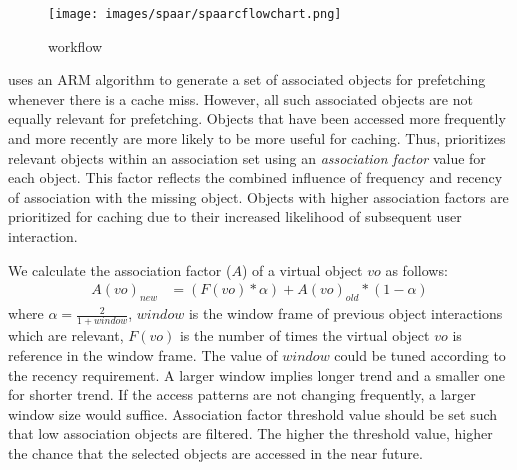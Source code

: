             \begin{figure}
                \centering
                \texttt{[image: images/spaar/spaarcflowchart.png]}
                \caption{\spaarc{} workflow}
                \label{fig:spaarcworkflow}
            \end{figure}

\spaarc{} uses an ARM algorithm to generate a set of associated objects for prefetching whenever there is a cache miss.
However, %
all such associated objects are not equally relevant for prefetching. Objects that have been accessed more frequently and more recently are more likely to be more useful for caching. Thus, \spaarc{} prioritizes relevant objects within an association set using an {\em association factor} value for each object. This factor reflects the combined influence of frequency and recency of association with the missing object. Objects with higher association factors are prioritized for caching due to their increased likelihood of subsequent user interaction. %

We calculate the association factor ($A$) of a virtual object $vo$ as follows:
            \begin{align}
                A(vo)_{new} & = (F(vo) * \alpha) + A(vo)_{old} * (1 - \alpha)
            \end{align}
            where $\alpha = \frac{2}{1 + window}$, $window$ is the window frame of previous object interactions which are relevant, $F(vo)$ is the number of times the virtual object $vo$ is reference in the window frame. The value of $window$ could be tuned according to the recency requirement. A larger window implies longer trend and a smaller one for shorter trend. If the access patterns are not changing frequently, a larger window size would suffice. Association factor threshold value should be set such that low association objects are filtered. The higher the threshold value, higher the chance that the selected objects are accessed in the near future.

       

